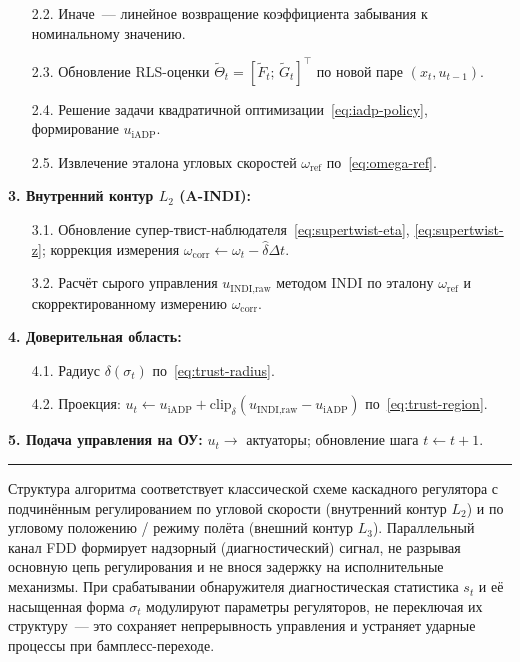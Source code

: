 \documentclass[a4paper,14pt]{extarticle}
\newcommand{\AINDI}{\textsc{A-INDI}}
\newcommand{\INDI}{\textsc{INDI}}
\newcommand{\FDD}{\textsc{FDD}}
\newcommand{\RLS}{\textsc{RLS}}
\begin{document}
\begin{center}
\begin{minipage}{0.96\linewidth}
\begin{enumerate}
\item[2.2.] Иначе~--- линейное возвращение коэффициента забывания к номинальному значению.
\item[2.3.] Обновление \RLS{}-оценки $\tilde \Theta_t = [\tilde F_t;\,\tilde G_t]^\top$ по новой паре $(x_t,u_{t-1})$.
\item[2.4.] Решение задачи квадратичной оптимизации~\eqref{eq:iadp-policy}, формирование $u_\text{iADP}$.
\item[2.5.] Извлечение эталона угловых скоростей $\omega_\text{ref}$ по~\eqref{eq:omega-ref}.
\end{enumerate}
\textbf{3. Внутренний контур $L_2$ (\AINDI{}):}
\begin{enumerate}
\item[3.1.] Обновление супер-твист-наблюдателя~\eqref{eq:supertwist-eta}, \eqref{eq:supertwist-z}; коррекция измерения $\omega_\text{corr} \leftarrow \omega_t - \hat\delta\Delta t$.
\item[3.2.] Расчёт сырого управления $u_\text{INDI,raw}$ методом \INDI{} по эталону $\omega_\text{ref}$ и скорректированному измерению $\omega_\text{corr}$.
\end{enumerate}
\textbf{4. Доверительная область:}
\begin{enumerate}
\item[4.1.] Радиус $\delta(\sigma_t)$ по~\eqref{eq:trust-radius}.
\item[4.2.] Проекция: $u_t \leftarrow u_\text{iADP} + \mathrm{clip}_\delta(u_\text{INDI,raw} - u_\text{iADP})$ по~\eqref{eq:trust-region}.
\end{enumerate}
\textbf{5. Подача управления на ОУ:} $u_t \to$ актуаторы; обновление шага $t \leftarrow t+1$.\\[2pt]
\rule{\linewidth}{0.6pt}
\end{minipage}
\end{center}

Структура алгоритма соответствует классической схеме каскадного регулятора с подчинённым регулированием по угловой скорости (внутренний контур $L_2$) и по угловому положению / режиму полёта (внешний контур $L_3$). Параллельный канал \FDD{} формирует надзорный (диагностический) сигнал, не разрывая основную цепь регулирования и не внося задержку на исполнительные механизмы. При срабатывании обнаружителя диагностическая статистика $s_t$ и её насыщенная форма $\sigma_t$ модулируют параметры регуляторов, не переключая их структуру~--- это сохраняет непрерывность управления и устраняет ударные процессы при бамплесс-переходе.
\end{document}
